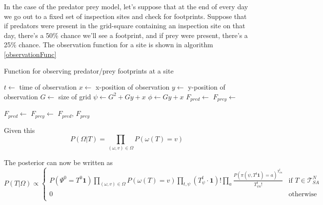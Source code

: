 \documentclass{article}
\begin{document}
In the case of the predator prey model, let's suppose that at the end of every day we go out to a fixed set of inspection sites and check for footprints. Suppose that if predators were present in the grid-square containing an inspection site on that day, there's a 50\% chance we'll see a footprint, and if prey were present, there's a 25\% chance. The observation function for a site is shown in algorithm \ref{observationFunc}

\begin{algorithm}
	\caption{Function for observing predator/prey footprints at a site}
	\label{observationFunc}
	\begin{algorithmic}
		 
		\State $t \leftarrow$ time of observation
		\State $x \leftarrow$ x-position of observation
		\State $y \leftarrow$ y-position of observation
		\State $G \leftarrow$ size of grid
		\State $\psi \leftarrow G^2 + Gy + x$     
		\State $\phi \leftarrow Gy + x$     
		\State $F_{pred} \leftarrow$   
		\State $F_{prey} \leftarrow$   
		
		\State $F_{pred} \leftarrow$ 
		\EndIf
		\State $F_{prey} \leftarrow$ 
		\EndIf
		\State\Return $F_{pred}$, $F_{prey}$
		\EndFunction
	\end{algorithmic}
\end{algorithm}


Given this
\[
P(\Omega|T) = \prod_{(\omega,v) \in \Omega} P(\omega(T)=v)
\]

The posterior can now be written as
\begin{equation}
P(T|\Omega) \propto 
\begin{cases}
P(\Psi^0 = T^0\mathbf{1})
\prod_{(\omega,v) \in \Omega} P\left(\omega(T)=v\right)
\prod_{t, \psi}\left(T^t_{\psi}\cdot\mathbf{1}\right)!
\prod_{a}\frac{P(\pi(\psi,T^t\mathbf{1})=a)^{T^{t}_{\psi a}}}{T^t_{\psi a}!} & \text{if } T \in \mathcal{T}^N_{SA} \\
0 & \text{otherwise}\\
\end{cases}
\label{posterior}
\end{equation}
\end{document}
